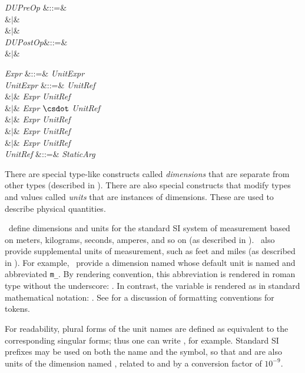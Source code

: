 \begin{Grammar}
\emph{DUPreOp} &::=& \\
&$|$&  \\
&$|$& \\

\emph{DUPostOp}&::=& \\
&$|$& \\

\end{Grammar}

\begin{GrammarTwo}
\emph{Expr} &::=& \emph{UnitExpr}\\

\emph{UnitExpr} &::=& \emph{UnitRef}\\
&$|$& \emph{Expr} \emph{UnitRef}\\
&$|$& \emph{Expr} $\csdot$ \emph{UnitRef}\\
&$|$& \emph{Expr} \EXP{/} \emph{UnitRef}\\
&$|$& \emph{Expr}  \emph{UnitRef}\\
&$|$& \emph{Expr}  \emph{UnitRef}\\

\emph{UnitRef} &::=& \emph{StaticArg} \\

\end{GrammarTwo}

There are special type-like constructs called \emph{dimensions} that are
separate from other types (described in ).
There are also special constructs that modify types and values called
\emph{units} that are instances of dimensions.
These are used to describe physical quantities.

\Library\ define dimensions and units for the standard SI system of measurement
based on meters, kilograms, seconds, amperes, and so on (as described in
).   \Library\ also provide
supplemental units of measurement, such as feet and miles (as described in
).  For example,
\library\ provide a dimension named  whose default unit is named
 and abbreviated \verb$m_$.
By rendering convention, this abbreviation is rendered in roman type
without the underscore: . In contrast, the variable  is rendered as in standard
mathematical notation: .
See  for a discussion of formatting conventions for tokens.

For readability, plural forms of the unit names are defined as equivalent to the
corresponding singular forms; thus one can write ,
for example.
Standard SI prefixes may be used on both the name and the symbol, so that 
and  are also units of the dimension named , related to 
and  by a conversion factor of $10^{-9}$.

